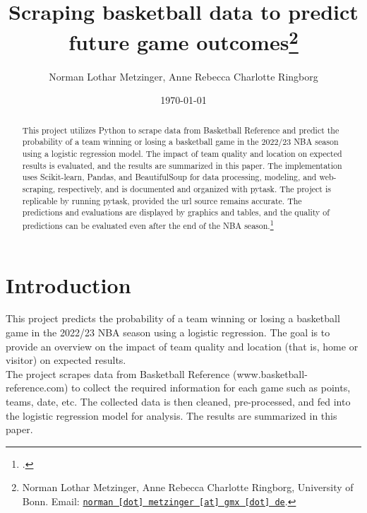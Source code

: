 \documentclass[11pt, a4paper, leqno]{article}
\begin{document}
\title{Scraping basketball data to predict future game outcomes\thanks{Norman Lothar Metzinger, Anne Rebecca Charlotte Ringborg, University of Bonn. Email: \href{mailto:norman.metzinger@gmx.de}{\nolinkurl{norman [dot] metzinger [at] gmx [dot] de}}.}}

\author{Norman Lothar Metzinger, Anne Rebecca Charlotte Ringborg}

\date{
    \today
}

\maketitle


\begin{abstract}
    This project utilizes Python to scrape data from Basketball Reference and predict the probability of a team winning or losing a basketball game in the 2022/23 NBA season using a logistic regression model.
    The impact of team quality and location on expected results is evaluated, and the results are summarized in this paper.
    The implementation uses Scikit-learn, Pandas, and BeautifulSoup for data processing, modeling, and web-scraping, respectively, and is documented and organized with pytask.
    The project is replicable by running pytask, provided the url source remains accurate.
    The predictions and evaluations are displayed by graphics and tables, and the quality of predictions can be evaluated even after the end of the NBA season.\footcite{The content of this abstract was generated with the assistance of OpenAI's ChatGPT language model.}
\end{abstract}

\clearpage


\section{Introduction} %
\label{sec:introduction}

This project predicts the probability of a team winning or losing a basketball game in the 2022/23 NBA season using a logistic regression. The goal is to provide an overview on the impact of team quality and location (that is, home or visitor) on expected results.\\

The project scrapes data from Basketball Reference (www.basketball-reference.com) to collect the required information for each game such as points, teams, date, etc.
The collected data is then cleaned, pre-processed, and fed into the logistic regression model for analysis. The results are summarized in this paper.\\
\end{document}
